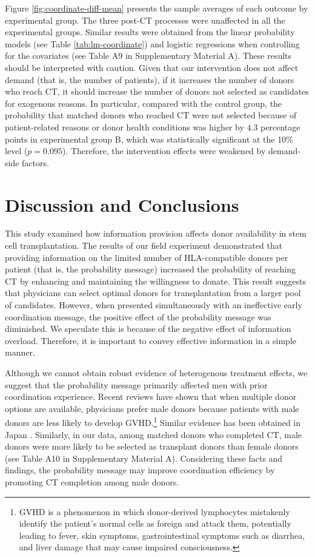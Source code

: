 \documentclass[12pt, a4paper]{article}
\begin{document}
Figure \ref{fig:coordinate-diff-mean} presents the sample averages of each outcome by experimental group. The three post-CT processes were unaffected in all the experimental groups. Similar results were obtained from the linear probability models (see Table \ref{tab:lm-coordinate}) and logistic regressions when controlling for the covariates (see Table A9 in Supplementary Material A). These results should be interpreted with caution. Given that our intervention does not affect demand (that is, the number of patients), if it increases the number of donors who reach CT, it should increase the number of donors not selected as candidates for exogenous reasons. In particular, compared with the control group, the probability that matched donors who reached CT were not selected because of patient-related reasons or donor health conditions was higher by \(4.3\) percentage points in experimental group B, which was statistically significant at the 10\% level (\(p = 0.095\)). Therefore, the intervention effects were weakened by demand-side factors.

\section{Discussion and Conclusions}\label{conclusion}

This study examined how information provision affects donor availability in stem cell transplantation. The results of our field experiment demonstrated that providing information on the limited number of HLA-compatible donors per patient (that is, the probability message) increased the probability of reaching CT by enhancing and maintaining the willingness to donate. This result suggests that physicians can select optimal donors for transplantation from a larger pool of candidates. However, when presented simultaneously with an ineffective early coordination message, the positive effect of the probability message was diminished. We speculate this is because of the negative effect of information overload. Therefore, it is important to convey effective information in a simple manner.

Although we cannot obtain robust evidence of heterogenous treatment effects, we suggest that the probability message primarily affected men with prior coordination experience. Recent reviews have shown that when multiple donor options are available, physicians prefer male donors \citep{Fingrut2018} because patients with male donors are less likely to develop GVHD.\footnote{GVHD is a phenomenon in which donor-derived lymphocytes mistakenly identify the patient's normal cells as foreign and attack them, potentially leading to fever, skin symptoms, gastrointestinal symptoms such as diarrhea, and liver damage that may cause impaired consciousness.} Similar evidence has been obtained in Japan \citep{Shinohara2017}. Similarly, in our data, among matched donors who completed CT, male donors were more likely to be selected as transplant donors than female donors (see Table A10 in Supplementary Material A). Considering these facts and findings, the probability message may improve coordination efficiency by promoting CT completion among male donors.
\end{document}
